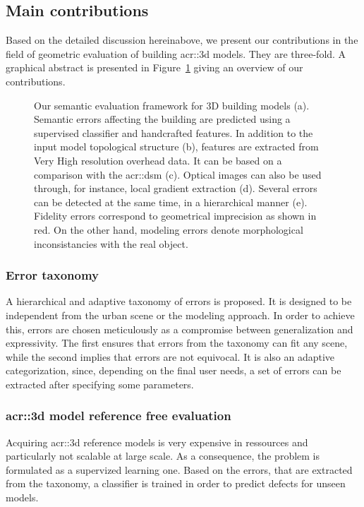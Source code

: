     \subsection{Main contributions}
        \label{sec::introduction::contributions::contributions}
        Based on the detailed discussion hereinabove, we present our contributions in the field of geometric evaluation of building \gls{acr::3d} models.
        They are three-fold.
        A graphical abstract is presented in Figure~\ref{fig::graphical_abstract} giving an overview of our contributions.
        \begin{figure}[htpb]
            \centering
                        
            \caption{
                \label{fig::graphical_abstract} Our semantic evaluation framework for 3D building models (a).
                Semantic errors affecting the building are predicted using a supervised classifier and handcrafted features.
                In addition to the input model topological structure (b), features are extracted from Very High resolution overhead data.
                It can be based on a comparison with the \gls*{acr::dsm} (c).
                Optical images can also be used through, for instance, local gradient extraction (d).
                Several errors can be detected at the same time, in a hierarchical manner (e).
                Fidelity errors correspond to geometrical imprecision as shown in red.
                On the other hand, modeling errors denote morphological inconsistancies with the real object.
            }
        \end{figure}
        \subsubsection{Error taxonomy}
            A hierarchical and adaptive taxonomy of errors is proposed.
            It is designed to be independent from the urban scene or the modeling approach.
            In order to achieve this, errors are chosen meticulously as a compromise between generalization and expressivity.
            The first ensures that errors from the taxonomy can fit any scene, while the second implies that errors are not equivocal.
            It is also an adaptive categorization, since, depending on the final user needs, a set of errors can be extracted after specifying some parameters.
            
        \subsubsection{\gls*{acr::3d} model reference free evaluation}
            Acquiring \gls{acr::3d} reference models is very expensive in ressources and particularly not scalable at large scale.
            As a consequence, the problem is formulated as a supervized learning one.
            Based on the errors, that are extracted from the taxonomy, a classifier is trained in order to predict defects for unseen models.

